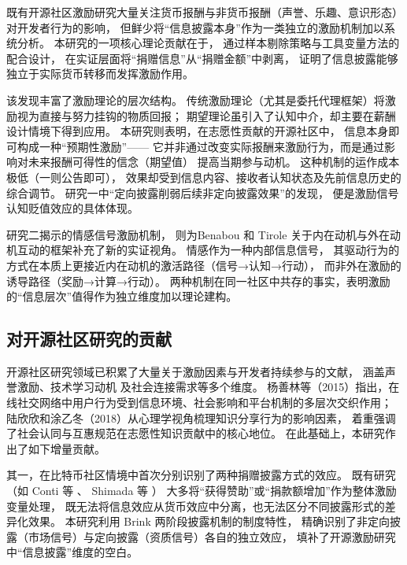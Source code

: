 既有开源社区激励研究大量关注货币报酬与非货币报酬（声誉、乐趣、意识形态）
对开发者行为的影响\cite{lerner2002simple,shah2006motivation}，
但鲜少将“信息披露本身”作为一类独立的激励机制加以系统分析。
本研究的一项核心理论贡献在于，
通过样本剔除策略与工具变量方法的配合设计，
在实证层面将“捐赠信息”从“捐赠金额”中剥离，
证明了信息披露能够独立于实际货币转移而发挥激励作用。

该发现丰富了激励理论的层次结构。
传统激励理论（尤其是委托代理框架）将激励视为直接与努力挂钩的物质回报；
期望理论虽引入了认知中介，却主要在薪酬设计情境下得到应用。
本研究则表明，在志愿性贡献的开源社区中，
信息本身即可构成一种“预期性激励”——
它并非通过改变实际报酬来激励行为，而是通过影响对未来报酬可得性的信念（期望值）
提高当期参与动机\cite{vroom1964work}。
这种机制的运作成本极低（一则公告即可），
效果却受到信息内容、接收者认知状态及先前信息历史的综合调节。
研究一中“定向披露削弱后续非定向披露效果”的发现，
便是激励信号认知贬值效应的具体体现\cite{oliver1980cognitive}。

研究二揭示的情感信号激励机制，
则为Benabou 和 Tirole \citeyear{benabou2003intrinsic}
关于内在动机与外在动机互动的框架补充了新的实证视角。
情感作为一种内部信息信号，
其驱动行为的方式在本质上更接近内在动机的激活路径（信号→认知→行动），
而非外在激励的诱导路径（奖励→计算→行动）。
两种机制在同一社区中共存的事实，表明激励的“信息层次”值得作为独立维度加以理论建构。

\subsection{对开源社区研究的贡献}

开源社区研究领域已积累了大量关于激励因素与开发者持续参与的文献，
涵盖声誉激励\cite{lerner2002simple}、技术学习动机\cite{fang2009understanding}
及社会连接需求\cite{yang2021differential}等多个维度。
杨善林等（2015）指出，在线社交网络中用户行为受到信息环境、社会影响和平台机制的多层次交织作用\cite{yang2015social}；
陆欣欣和涂乙冬（2018）从心理学视角梳理知识分享行为的影响因素，
着重强调了社会认同与互惠规范在志愿性知识贡献中的核心地位\cite{lu2018sharing}。
在此基础上，本研究作出了如下增量贡献。

其一，在比特币社区情境中首次分别识别了两种捐赠披露方式的效应。
既有研究（如 Conti 等 \citeyear{conti2023incentivizing}、
Shimada 等 \citeyear{shimada2022github}）
大多将“获得赞助”或“捐款额增加”作为整体激励变量处理，
既无法将信息效应从货币效应中分离，也无法区分不同披露形式的差异化效果。
本研究利用 Brink 两阶段披露机制的制度特性，
精确识别了非定向披露（市场信号）与定向披露（资质信号）各自的独立效应，
填补了开源激励研究中“信息披露”维度的空白。


